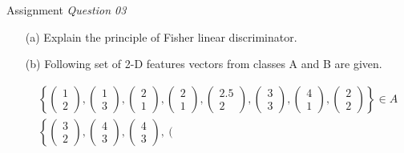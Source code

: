 \begin{frame}{Assignment}
\textit{\color{slidecolor}Question 03}\\
\begin{itemize}
\item[(a)] Explain the principle of Fisher linear discriminator.
\item[(b)] Following set of 2-D features vectors from classes A and B are given.
\begin{scriptsize}
\begin{equation}
\begin{array}{l}
\left\{ {\left( {\begin{array}{*{20}{c}}
1\\
2
\end{array}} \right),\left( {\begin{array}{*{20}{c}}
1\\
3
\end{array}} \right),\left( {\begin{array}{*{20}{c}}
2\\
1
\end{array}} \right),\left( {\begin{array}{*{20}{c}}
2\\
1
\end{array}} \right),\left( {\begin{array}{*{20}{c}}
{2.5}\\
2
\end{array}} \right),\left( {\begin{array}{*{20}{c}}
3\\
3
\end{array}} \right),\left( {\begin{array}{*{20}{c}}
4\\
1
\end{array}} \right),\left( {\begin{array}{*{20}{c}}
2\\
2
\end{array}} \right)} \right\} \in A\\
\left\{ {\left( {\begin{array}{*{20}{c}}
3\\
2
\end{array}} \right),\left( {\begin{array}{*{20}{c}}
4\\
3
\end{array}} \right),\left( {\begin{array}{*{20}{c}}
4\\
3
\end{array}} \right),\left( {\begin{array}{*{20}{c}}

\end{array}}}
\end{array}
\end{equation}
\end{scriptsize}
\end{itemize}
\end{frame}
